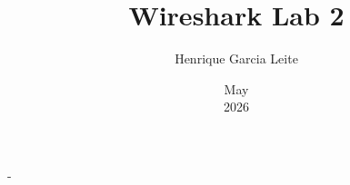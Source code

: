 \documentclass[a4paper, answers]{exam}
\title{Wireshark Lab 2}
\author{Henrique Garcia Leite}
\date{May\\2026}
\begin{document}
\begin{titlepage}
    \maketitle
\end{titlepage}



-
\end{document}
